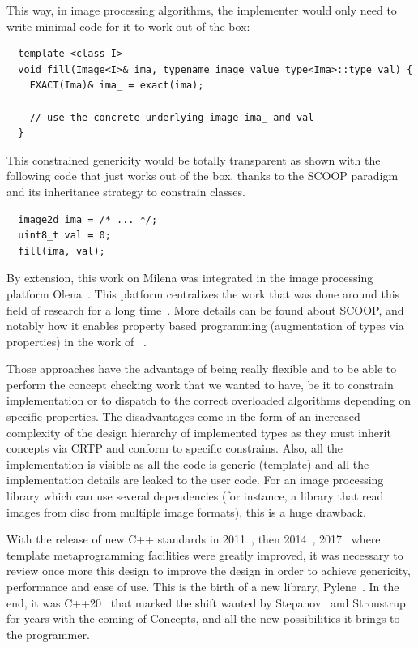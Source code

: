 This way, in image processing algorithms, the implementer would only need to write minimal code for it to work out of
the box:

\begin{verbatim}
  template <class I>
  void fill(Image<I>& ima, typename image_value_type<Ima>::type val) {
    EXACT(Ima)& ima_ = exact(ima);

    // use the concrete underlying image ima_ and val
  }
\end{verbatim}

This constrained genericity would be totally transparent as shown with the following code that just works out of the
box, thanks to the SCOOP paradigm and its inheritance strategy to constrain classes.
\begin{verbatim}
  image2d ima = /* ... */;
  uint8_t val = 0;
  fill(ima, val);
\end{verbatim}

By extension, this work on Milena was integrated in the image processing platform
Olena~\parencite{olena.2000.www,geraud.2012.hdr}. This platform centralizes the work that was done around this field of
research for a long time~\parencite{geraud.2000.icpr,duretlutz.2000.olena,darbon.2002.ismm,darbon.2004.ecoopphd}. More
details can be found about SCOOP, and notably how it enables property based programming (augmentation of types via
properties) in the work of
\citeauthor{levillain.2011.phd}~\parencite{levillain.2011.phd,levillain.2009.ismm,levillain.2010.icip,levillain.2010.wadgmm,levillain.2011.gretsi,levillain.2011.phd,levillain.2012.wadgmm-lncs,levillain.2014.ciarp}.

Those approaches have the advantage of being really flexible and to be able to perform the concept checking work that we
wanted to have, be it to constrain implementation or to dispatch to the correct overloaded algorithms depending on
specific properties. The disadvantages come in the form of an increased complexity of the design hierarchy of
implemented types as they must inherit concepts via CRTP and conform to specific constrains. Also, all the
implementation is visible as all the code is generic (template) and all the implementation details are leaked to the
user code. For an image processing library which can use several dependencies (for instance, a library that read images
from disc from multiple image formats), this is a huge drawback.

With the release of new C++ standards in 2011~\parencite{iso.2011.cpp}, then 2014~\parencite{iso.2014.cpp},
2017~\parencite{iso.2017.cpp} where template metaprogramming facilities were greatly improved, it was necessary to
review once more this design to improve the design in order to achieve genericity, performance and ease of use. This is
the birth of a new library, Pylene~\parencite{carlinet.2018.pylena}. In the end, it was C++20~\parencite{iso.2011.cpp}
that marked the shift wanted by
Stepanov~\parencite{musser.1988.generic,musser.1994.algorithm,dehnert.1998.fundamentals,stepanov.2009.elements} and
Stroustrup~\parencite{stroustrup.1995.design,stroustrup.1999.hot,stroustrup.2003.concepts,stroustrup.2007.hopl} for
years with the coming of Concepts, and all the new possibilities it brings to the programmer.

